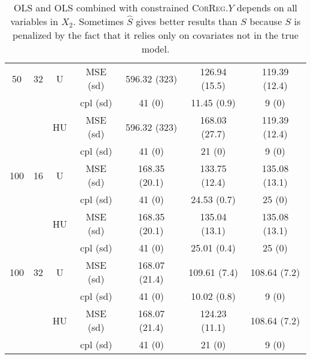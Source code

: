 \documentclass[11pt,a4paper]{article}
\begin{document}
\begin{table}[h!]
\begin{tabular}{|c|c|c|c|c|c|c|}
\hline %
50 & 32 & U&MSE (sd) & 596.32 (323) & 126.94 (15.5) & 119.39 (12.4) \\
& & & cpl (sd) & 41 (0) & 11.45 (0.9) & 9 (0) \\
 &  &HU &MSE (sd) & 596.32 (323) & 168.03 (27.7) & 119.39 (12.4) \\
& & &cpl (sd) & 41 (0) & 21 (0) & 9 (0) \\
\hline
\hline %
100 & 16 & U&  MSE (sd) & 168.35 (20.1) & 133.75 (12.4) & 135.08 (13.1) \\
& & & cpl (sd) & 41 (0) & 24.53 (0.7) & 25 (0) \\
 &  &HU &  MSE (sd) & 168.35 (20.1) & 135.04 (13.1) & 135.08 (13.1) \\
& & & cpl (sd) & 41 (0) & 25.01 (0.4) & 25 (0) \\
\hline %
100 & 32 & U&  MSE (sd) & 168.07 (21.4) & 109.61 (7.4) & 108.64 (7.2) \\
& & &  cpl (sd) & 41 (0) & 10.02 (0.8) & 9 (0) \\
 &  &HU & MSE (sd) & 168.07 (21.4) & 124.23 (11.1) & 108.64 (7.2) \\
& & & cpl (sd) & 41 (0) & 21 (0) & 9 (0) \\
\hline
\end{tabular} 
\caption{OLS and OLS combined with constrained \textsc{CorReg}.$Y$  depends on all variables in $X_2$. Sometimes $\hat{S}$ gives better results than $S$ because $S$ is penalized by the fact that it relies only on covariates not in the true model. } \label{YX2linOLS}
\end{table}
\end{document}

